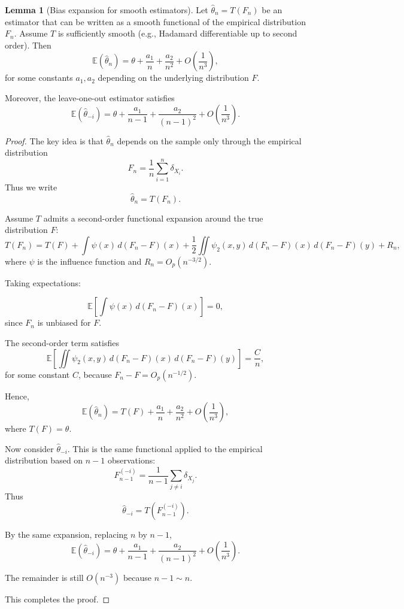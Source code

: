 \documentclass[11pt]{article}
\theoremstyle{definition}
\newtheorem{lemma}{Lemma}[section]
\begin{document}
\begin{lemma}[Bias expansion for smooth estimators]
Let \(\hat\theta_n = T(F_n)\) be an estimator that can be written as a smooth functional of the empirical distribution \(F_n\). Assume \(T\) is sufficiently smooth (e.g., Hadamard differentiable up to second order). Then
\[
\mathbb E(\hat\theta_n)
=
\theta + \frac{a_1}{n} + \frac{a_2}{n^2} + O\!\left(\frac{1}{n^3}\right),
\]
for some constants \(a_1, a_2\) depending on the underlying distribution \(F\).

Moreover, the leave-one-out estimator satisfies
\[
\mathbb E(\hat\theta_{-i})
=
\theta + \frac{a_1}{n-1} + \frac{a_2}{(n-1)^2} + O\!\left(\frac{1}{n^3}\right).
\]
\end{lemma}

\begin{proof}
The key idea is that \(\hat\theta_n\) depends on the sample only through the empirical distribution
\[
F_n = \frac{1}{n}\sum_{i=1}^n \delta_{X_i}.
\]
Thus we write
\[
\hat\theta_n = T(F_n).
\]

Assume \(T\) admits a second-order functional expansion around the true distribution \(F\):
\[
T(F_n)
=
T(F)
+ \int \psi(x)\, d(F_n - F)(x)
+ \frac{1}{2}\iint \psi_2(x,y)\, d(F_n - F)(x)\, d(F_n - F)(y)
+ R_n,
\]
where \(\psi\) is the influence function and \(R_n = O_p(n^{-3/2})\).

Taking expectations:

\[
\mathbb E\left[\int \psi(x)\, d(F_n - F)(x)\right] = 0,
\]
since \(F_n\) is unbiased for \(F\).

The second-order term satisfies
\[
\mathbb E\left[\iint \psi_2(x,y)\, d(F_n - F)(x)\, d(F_n - F)(y)\right]
=
\frac{C}{n},
\]
for some constant \(C\), because \(F_n - F = O_p(n^{-1/2})\).

Hence,
\[
\mathbb E(\hat\theta_n)
=
T(F) + \frac{a_1}{n} + \frac{a_2}{n^2} + O\!\left(\frac{1}{n^3}\right),
\]
where \(T(F)=\theta\).

Now consider \(\hat\theta_{-i}\). This is the same functional applied to the empirical distribution based on \(n-1\) observations:
\[
F_{n-1}^{(-i)} = \frac{1}{n-1}\sum_{j\ne i} \delta_{X_j}.
\]
Thus
\[
\hat\theta_{-i} = T(F_{n-1}^{(-i)}).
\]

By the same expansion, replacing \(n\) by \(n-1\),
\[
\mathbb E(\hat\theta_{-i})
=
\theta + \frac{a_1}{n-1} + \frac{a_2}{(n-1)^2} + O\!\left(\frac{1}{n^3}\right).
\]

The remainder is still \(O(n^{-3})\) because \(n-1 \sim n\).

This completes the proof.
\end{proof}
\end{document}
